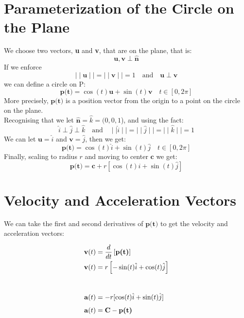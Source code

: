 \documentclass[11pt]{article}
\begin{document}
\section*{Parameterization of the Circle on the Plane}
We choose two vectors, \textbf{u} and \textbf{v}, that are on the plane, that is:
$$\mathbf{u}, \textbf{v} \perp \hat{\textbf{n}}$$
If we enforce $$\mid \mid \mathbf{u} \mid \mid = \mid \mid \textbf{v} \mid \mid = 1 \quad \text{and} \quad \mathbf{u} \perp \textbf{v}$$
we can define a circle on P:
$$\textbf{p(t)} = \cos(t) \mathbf{u} + \sin(t) \textbf{v} \quad t \in [0, 2\pi]$$
More precisely, $\textbf{p(t)}$ is a position vector from the origin to a point on the circle on the plane. \\
Recognising that we let $\hat{\textbf{n}} = \hat{k} = (0,0,1$), and using the fact:
$$\hat{i} \perp \hat{j} \perp \hat{k} \quad \text{and} \quad \mid \mid \hat{i} \mid \mid = \mid \mid \hat{j} \mid \mid = \mid \mid \hat{k} \mid \mid = 1$$
We can let $\textbf{u} = \hat{i}$ and $\textbf{v} = \hat{j}$, then we get:
$$\textbf{p(t)} = \cos(t) \hat{i} + \sin(t) \hat{j}\quad t \in [0, 2\pi]$$
Finally, scaling to radius $r$ and moving to center $\mathbf{c}$ we get:
$$\textbf{p(t)} = \mathbf{c} + r \left[\cos(t) \hat{i} + \sin(t) \hat{j}\right]$$
\section*{Velocity and Acceleration Vectors}
We can take the first and second derivatives of $\textbf{p(t)}$ to get the velocity and acceleration vectors:

\begin{align*}
    \mathbf{v}(t) & = \frac{d}{dt} \left[\textbf{p(t)}\right] \\               
    \mathbf{v}(t) & = r\left[-\sin(t) \hat{i} + \cos(t) \hat{j} \right] \\[1ex]
          \\[1ex]                                                  
          \mathbf{a}(t) &= -r[\cos(t)\hat{i} + \sin(t)\hat{j}] \\[1ex]
          \mathbf{a}(t) &= \mathbf{C} - \textbf{\textbf{p(t)}}
\end{align*}
\end{document}
